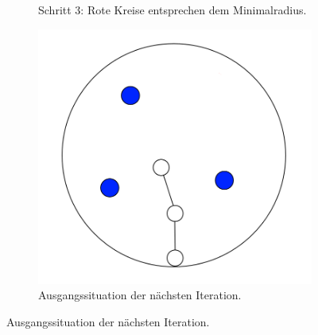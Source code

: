 \begin{figure} [hbtp]
\begin{subfigure}[t]{.31\textwidth}
		\caption{Schritt 3: Rote Kreise entsprechen dem Minimalradius.}
		\label{subfig:SCA_Basic5}
	\end{subfigure}
	\hspace{.01\textwidth}
	\begin{subfigure}[t]{.31\textwidth}
		\centering
		\includegraphics[width=\linewidth]{images/SCA_Basic6.png}
		\caption{Ausgangssituation der nächsten Iteration.}
		\label{subfig:SCA_Basic6}
	\end{subfigure}


\end{figure}
